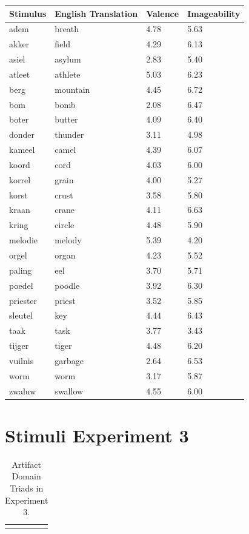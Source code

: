 \documentclass[doc]{apa6}
\begin{document}
\begin{appendix}
\begin{small}
\begin{longtable}{llll}
\label{table:AppendixBIBD}
Stimulus  & English Translation & Valence & Imageability\\
\toprule
adem & breath & 4.78 & 5.63 \\
akker & field & 4.29 & 6.13\\
asiel & asylum & 2.83 & 5.40\\
atleet & athlete & 5.03 & 6.23\\
berg & mountain & 4.45 & 6.72\\
bom & bomb & 2.08 & 6.47\\
boter & butter & 4.09 & 6.40\\
donder & thunder & 3.11 & 4.98\\
kameel & camel & 4.39 & 6.07\\
koord & cord & 4.03 & 6.00\\
korrel & grain & 4.00 & 5.27\\
korst & crust & 3.58 & 5.80\\
kraan & crane & 4.11 & 6.63\\
kring & circle & 4.48 & 5.90\\
melodie & melody & 5.39 & 4.20\\
orgel & organ & 4.23 & 5.52\\
paling & eel & 3.70 & 5.71\\
poedel & poodle & 3.92 & 6.30\\
priester & priest & 3.52 & 5.85\\
sleutel & key & 4.44 & 6.43\\
taak & task & 3.77 & 3.43\\
tijger & tiger & 4.48 & 6.20\\
vuilnis & garbage & 2.64 & 6.53\\
worm & worm & 3.17 & 5.87\\
zwaluw & swallow & 4.55 & 6.00\\
\bottomrule
\end{longtable}
\end{small}



\section{Stimuli Experiment 3}
\label{Appendix:DomainTriads}

\begin{small}
\begin{longtable}{lll}
\caption[Artifact Domain Triads in Experiment 3.]{Artifact Domain Triads in Experiment 3.}\\
\label{table:AppendixArtifactsDomain}


\end{longtable}
\end{small}
\end{appendix}
\end{document}
